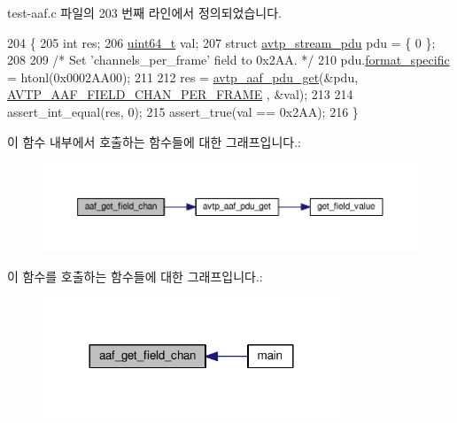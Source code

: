 test-\/aaf.\+c 파일의 203 번째 라인에서 정의되었습니다.


\begin{DoxyCode}
204 \{
205     \textcolor{keywordtype}{int} res;
206     \hyperlink{parse_8c_aec6fcb673ff035718c238c8c9d544c47}{uint64\_t} val;
207     \textcolor{keyword}{struct }\hyperlink{structavtp__stream__pdu}{avtp\_stream\_pdu} pdu = \{ 0 \};
208 
209     \textcolor{comment}{/* Set 'channels\_per\_frame' field to 0x2AA. */}
210     pdu.\hyperlink{structavtp__stream__pdu_acbfc36b550978f88cf0a3d9d2b2ce0dd}{format\_specific} = htonl(0x0002AA00);
211 
212     res = \hyperlink{avtp__aaf_8h_acc4c927b036e22def8e6b6beb3ac6026}{avtp\_aaf\_pdu\_get}(&pdu, \hyperlink{avtp__aaf_8h_a7eaee6c1ebc806c0401dbe7b14cd22dbab6202d8ac4e1b7e819e5adb08b90a346}{AVTP\_AAF\_FIELD\_CHAN\_PER\_FRAME}
      , &val);
213 
214     assert\_int\_equal(res, 0);
215     assert\_true(val == 0x2AA);
216 \}
\end{DoxyCode}


이 함수 내부에서 호출하는 함수들에 대한 그래프입니다.\+:
\nopagebreak
\begin{figure}[H]
\begin{center}
\leavevmode
\includegraphics[width=350pt]{test-aaf_8c_ae21ae6143c92aa007dd7a7867eb7b3ac_cgraph}
\end{center}
\end{figure}




이 함수를 호출하는 함수들에 대한 그래프입니다.\+:
\nopagebreak
\begin{figure}[H]
\begin{center}
\leavevmode
\includegraphics[width=252pt]{test-aaf_8c_ae21ae6143c92aa007dd7a7867eb7b3ac_icgraph}
\end{center}
\end{figure}



